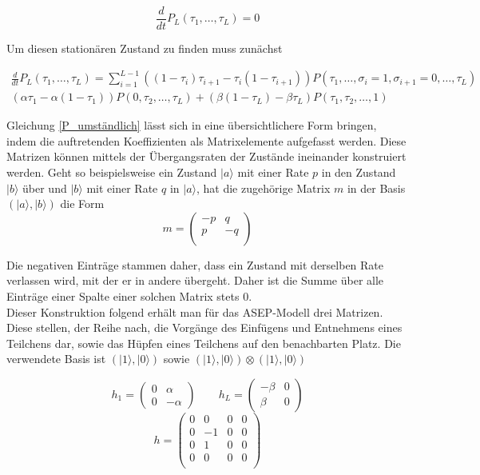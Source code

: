 \documentclass[10pt,a4paper]{report}
\begin{document}
\begin{equation}
\frac{d}{dt}P_L(\tau_1,\ldots,\tau_L)=0
\end{equation}

Um diesen stationären Zustand zu finden muss zunächst 

\begin{equation}\label{P_umständlich}
\begin{split}
\frac{d}{dt}P_L(\tau_1,\ldots,\tau_L) = \sum_{i=1}^{L-1}((1-\tau_i)\tau_{i+1}-\tau_i(1-\tau_{i+1}) )P(\tau_1,\ldots,\sigma_i=1,\sigma_{i+1}=0,\ldots,\tau_L)\\
(\alpha\tau_1-\alpha(1-\tau_1)) P(0,\tau_2,\ldots,\tau_L)+(\beta(1-\tau_L)-\beta\tau_L) P(\tau_1,\tau_2,\ldots,1)
\end{split}
\end{equation}

Gleichung \ref{P_umständlich} lässt sich in eine übersichtlichere Form bringen, indem die auftretenden Koeffizienten als Matrixelemente aufgefasst werden. Diese Matrizen können mittels der Übergangsraten der Zustände ineinander konstruiert werden. Geht so beispielsweise ein Zustand $|a\rangle$ mit einer Rate $p$ in den Zustand $|b\rangle$ über und $|b\rangle$ mit einer Rate $q$ in $|a\rangle$, hat die zugehörige Matrix $m$ in der Basis $(|a\rangle,|b\rangle)$ die Form
\begin{equation}
m=
\begin{pmatrix}
-p&q\\
p&-q\\
\end{pmatrix}
\end{equation}

Die negativen Einträge stammen daher, dass ein Zustand mit derselben Rate verlassen wird, mit der er in andere übergeht. Daher ist die Summe über alle Einträge einer Spalte einer solchen Matrix stets 0.\cite{ASEP_Update}\\

Dieser Konstruktion folgend erhält man für das ASEP-Modell drei Matrizen. Diese stellen, der Reihe nach, die Vorgänge des Einfügens und Entnehmens eines Teilchens dar, sowie das Hüpfen eines Teilchens auf den benachbarten Platz. Die verwendete Basis ist $(|1\rangle,|0\rangle)$ sowie $(|1\rangle,|0\rangle)\otimes(|1\rangle,|0\rangle)$

\begin{equation}
h_1=
\begin{pmatrix}
0&\alpha\\ 0&-\alpha
\end{pmatrix}
\qquad
h_L=
\begin{pmatrix}
-\beta&0\\ \beta&0
\end{pmatrix}
\end{equation}
\vspace{1px}
\begin{equation*}
h=
\begin{pmatrix}
0&0&0&0\\
0&-1&0&0\\
0&1&0&0\\
0&0&0&0\\
\end{pmatrix}
\end{equation*}
\end{document}
